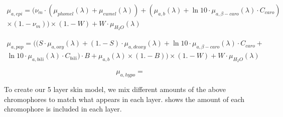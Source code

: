 \begin{equation}
\begin{split}
\mu_{a,epi}= (\nu_m \cdot (\mu_{phomel}(\lambda) + \mu_{eumel}(\lambda)) + (\mu_{a,b}(\lambda) + \ln10 \cdot \mu_{a,\beta-caro}(\lambda) \cdot C_{caro}) \\ \times (1. - \nu_m)) \times(1. - W) + W \cdot \mu_{H_2O}(\lambda)
\end{split}
\end{equation}

\begin{equation}
\begin{split}
\mu_{a,pap}=((S \cdot \mu_{a,oxy}(\lambda) + (1. - S) \cdot \mu_{a,deoxy}(\lambda) + \ln10 \cdot \mu_{a,\beta-caro}(\lambda) \cdot C_{caro} + \\ \ln10 \cdot \mu_{a,bili}(\lambda)\cdot C_{bili})\cdot B + \mu_{a,b}(\lambda) \times (1. - B)) \times (1. - W) + W \cdot \mu_{H_2O}(\lambda)
\end{split}
\end{equation}




\begin{equation}
\mu_{a,hypo}=
\end{equation}


To create our 5 layer skin model, we mix different amounts of the above chromophores to match what appears in each layer.
 shows the amount of each chromophore is included in each layer.



